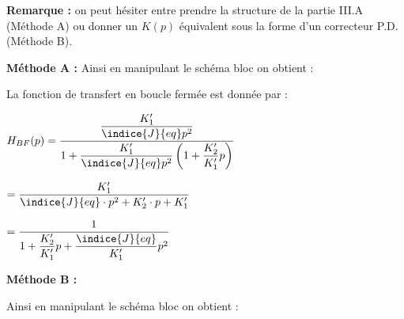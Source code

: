 \begin{corrige}

\textbf{Remarque : } on peut hésiter entre prendre la structure de la partie III.A (Méthode A) ou donner un $K(p)$ équivalent sous la forme d'un correcteur P.D. (Méthode B).

\begin{multicols}{2}
\textbf{Méthode A :}
Ainsi en manipulant le schéma bloc on obtient : 

\begin{center}
\end{center}

La fonction de transfert en boucle fermée est donnée par : 

$
H_{BF}(p)=\dfrac{\dfrac{K'_1}{\indice{J}{eq}p^2}}{1+\dfrac{K'_1}{\indice{J}{eq}p^2}\left(1+\dfrac{K'_2}{K'_1}p\right)}$

$=
\dfrac{K'_1}{\indice{J}{eq}\cdot p^2+K'_2\cdot p+K'_1}$

$=\dfrac{1}{1+\dfrac{K'_2}{K'_1}p+\dfrac{\indice{J}{eq}}{K'_1}p^2}
$



\textbf{Méthode B :}

Ainsi en manipulant le schéma bloc on obtient : 

\begin{center}
\end{center}


\end{multicols}
\end{corrige}
